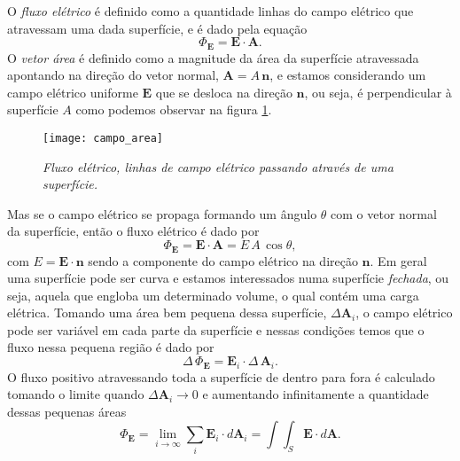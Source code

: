 O \textit{fluxo elétrico} é definido como a quantidade linhas do campo elétrico que atravessam uma dada superfície, e é dado pela equação
\begin{equation*}
\Phi_\textbf{E}=\textbf{E}\cdot\textbf{A}. 
\end{equation*} 
O \textit{vetor área} é definido como a magnitude da área da superfície atravessada apontando na direção do vetor normal, $\textbf{A}=A\,\textbf{n}$, e estamos considerando um campo elétrico uniforme $\textbf{E}$ que se desloca na direção $\textbf{n}$, ou seja, é perpendicular à superfície $A$ como podemos observar na figura \ref{fig.flux_ele}.
\begin{figure}[!htb]
\centering
\texttt{[image: campo\_area]}
\caption{\textit{Fluxo elétrico, linhas de campo elétrico passando através de uma superfície.}}
\label{fig.flux_ele}
\end{figure}
Mas se o campo elétrico se propaga formando um ângulo $\theta$ com o vetor normal da superfície, então o fluxo elétrico é dado por
\begin{equation*}
\Phi_\textbf{E}=\textbf{E}\cdot\textbf{A}=E\,A\,\cos\theta,
\end{equation*}
com $E=\textbf{E}\cdot\textbf{n}$ sendo a componente do campo elétrico na direção $\textbf{n}$. Em geral uma superfície pode ser curva e estamos interessados numa superfície \textit{fechada}, ou seja, aquela que engloba um determinado volume, o qual contém uma carga elétrica. Tomando uma área bem pequena dessa superfície, $\Delta\textbf{A}_i$, o campo elétrico pode ser variável em cada parte da superfície e nessas condições temos que o fluxo nessa pequena região é dado por
\begin{equation*}
\Delta\,\Phi_\textbf{E}=\textbf{E}_i\cdot\Delta\,\textbf{A}_i.
\end{equation*}
O fluxo positivo atravessando toda a superfície de dentro para fora é calculado tomando o limite quando $\Delta\textbf{A}_i\to 0$ e aumentando infinitamente a quantidade dessas pequenas áreas
\begin{equation}\label{eq.fluxo_eletr}
\Phi_\textbf{E}=\lim_{i\to\infty}\sum_i\textbf{E}_i\cdot\textit{d}\textbf{A}_i=\int\int_S\textbf{E}\cdot\textit{d}\textbf{A}.
\end{equation}

